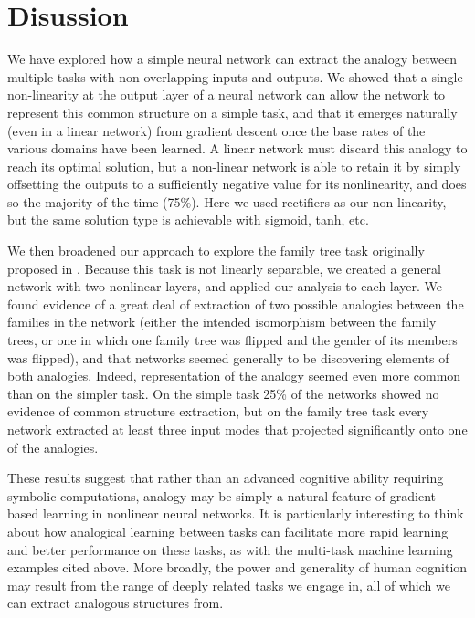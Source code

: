 \documentclass[10pt,letterpaper]{article}
\begin{document}
\section{Disussion}
We have explored how a simple neural network can extract the analogy between multiple tasks with non-overlapping inputs and outputs. We showed that a single non-linearity at the output layer of a neural network can allow the network to represent this common structure on a simple task, and that it emerges naturally (even in a linear network) from gradient descent once the base rates of the various domains have been learned. A linear network must discard this analogy to reach its optimal solution, but a non-linear network is able to retain it by simply offsetting the outputs to a sufficiently negative value for its nonlinearity, and does so the majority of the time (75\%). Here we used rectifiers as our non-linearity, but the same solution type is achievable with sigmoid, tanh, etc. \par 
We then broadened our approach to explore the family tree task originally proposed in \citet{Hinton1986}. Because this task is not linearly separable, we created a general network with two nonlinear layers, and applied our analysis to each layer. We found evidence of a great deal of extraction of two possible analogies between the families in the network (either the intended isomorphism between the family trees, or one in which one family tree was flipped and the gender of its members was flipped), and that networks seemed generally to be discovering elements of both analogies. Indeed, representation of the analogy seemed even more common than on the simpler task. On the simple task 25\% of the networks showed no evidence of common structure extraction, but on the family tree task every network extracted at least three input modes that projected significantly onto one of the analogies. \par 
These results suggest that rather than an advanced cognitive ability requiring symbolic computations, analogy may be simply a natural feature of gradient based learning in nonlinear neural networks. It is particularly interesting to think about how analogical learning between tasks can facilitate more rapid learning and better performance on these tasks, as with the multi-task machine learning examples cited above. More broadly, the power and generality of human cognition may result from the range of deeply related tasks we engage in, all of which we can extract analogous structures from. 
\end{document}
